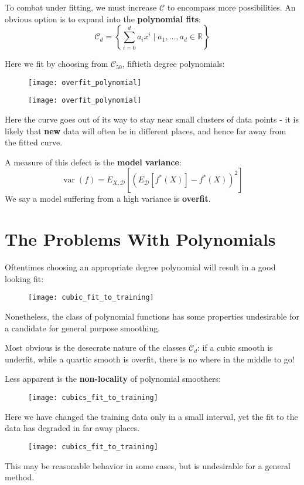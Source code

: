 \documentclass{beamer}
\DeclareMathOperator*{\var}{var}
\begin{document}
%
\begin{frame}
  To combat under fitting, we must increase $\mathcal{C}$ to encompass more possibilities. An obvious option is to expand into the \textbf{polynomial fits}:
  $$\mathcal{C}_d = \left\{ \sum_{i=0}^{d} a_i x^i \mid a_1, \ldots, a_d \in \mathbb{R} \right\}$$
\end{frame}
%
\begin{frame}
  Here we fit by choosing from $\mathcal{C}_{50}$, fiftieth degree polynomials:
  \begin{figure}
    \texttt{[image: overfit\_polynomial]}
  \end{figure}
\end{frame}
%
\begin{frame}
  \begin{figure}
    \texttt{[image: overfit\_polynomial]}
  \end{figure}
  Here the curve goes out of its way to stay near small clusters of data points - it is likely that \textbf{new} data will often be in different places, and hence far away from the fitted curve.
\end{frame}
%
\begin{frame}
  A measure of this defect is the \textbf{model variance}:
  $$ \var(f) = E_{X, \mathcal{D}} \left[ (E_{\mathcal{D}}[f^*(X)] - f^*(X))^2 \right] $$
  We say a model suffering from a high variance is \textbf{overfit}.
\end{frame}
%
\section{The Problems With Polynomials}
%
\begin{frame}
  Oftentimes choosing an appropriate degree polynomial will result in a  good looking fit:
  \begin{figure}
    \texttt{[image: cubic\_fit\_to\_training]}
  \end{figure}
  Nonetheless, the class of polynomial functions has some properties undesirable for a candidate for general purpose smoothing.
\end{frame}
%
\begin{frame}
  Most obvious is the desecrate nature of the classes $\mathcal{C}_d$: if a cubic smooth is underfit, while a quartic smooth is overfit, there is no where in the middle to go!
\end{frame}
%
\begin{frame}
  Less apparent is the \textbf{non-locality} of polynomial smoothers:
  \begin{figure}
    \texttt{[image: cubics\_fit\_to\_training]}
  \end{figure}
\end{frame}
%
\begin{frame}
  Here we have changed the training data only in a small interval, yet the fit to the data has degraded in far away places.
  \begin{figure}
    \texttt{[image: cubics\_fit\_to\_training]}
  \end{figure}
  This may be reasonable behavior in some cases, but is undesirable for a general method.
\end{frame}
\end{document}

